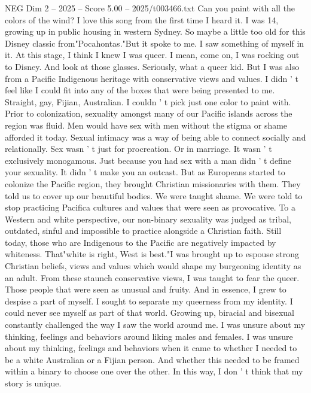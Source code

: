 \begin{textsample}{NEG Dim 2 – 2025 – Score 5.00 – 2025/t003466.txt}  \label{ex:f2_neg_004}
Can you paint with all the colors of the wind?
I love this song from the first time I heard it.
I was 14, growing up in public housing in western Sydney.
So maybe a little too old for this Disney classic from"Pocahontas."But it spoke to me.
I saw something of myself in it.
At this stage, I think I knew I was queer.
I mean, come on, I was rocking out to Disney.
And look at those glasses.
Seriously, what a queer kid.
But I was also from a Pacific Indigenous heritage with conservative views and values.
I didn ' t feel like I could fit into any of the boxes that were being presented to me.
Straight, gay, Fijian, Australian.
I couldn ' t pick just one color to paint with.
Prior to colonization, sexuality amongst many of our Pacific islands across the region was fluid.
Men would have sex with men without the stigma or shame afforded it today.
Sexual intimacy was a way of being able to connect socially and relationally.
Sex wasn ' t just for procreation.
Or in marriage.
It wasn ' t exclusively monogamous.
Just because you had sex with a man didn ' t define your sexuality.
It didn ' t make you an outcast.
But as Europeans started to colonize the Pacific region, they brought Christian missionaries with them.
They told us to cover up our beautiful bodies.
We were taught shame.
We were told to stop practicing Pacifica cultures and values that were seen as provocative.
To a Western and white perspective, our non-binary sexuality was judged as tribal, outdated, sinful and impossible to practice alongside a Christian faith.
Still today, those who are Indigenous to the Pacific are negatively impacted by whiteness.
That"white is right, West is best."I was brought up to espouse strong Christian beliefs, views and values which would shape my burgeoning identity as an adult.
From these staunch conservative views, I was taught to fear the queer.
Those people that were seen as unusual and fruity.
And in essence, I grew to despise a part of myself.
I sought to separate my queerness from my identity.
I could never see myself as part of that world.
Growing up, biracial and bisexual constantly challenged the way I saw the world around me.
I was unsure about my thinking, feelings and behaviors around liking males and females.
I was unsure about my thinking, feelings and behaviors when it came to whether I needed to be a white Australian or a Fijian person.
And whether this needed to be framed within a binary to choose one over the other.
In this way, I don ' t think that my story is unique.

\end{textsample}
